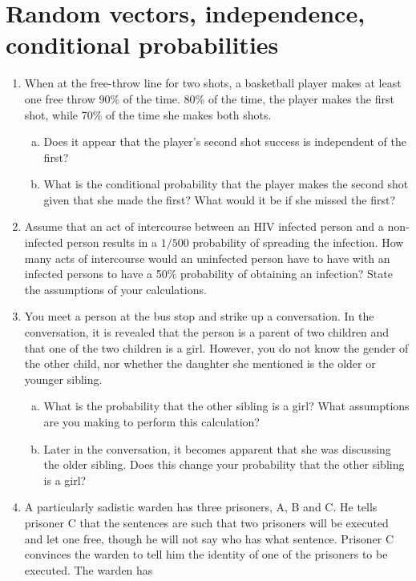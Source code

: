 \documentclass[12pt]{article}
\begin{document}
\section{Random vectors, independence, conditional probabilities}
\begin{enumerate}[1.]
\item When at the free-throw line for two shots, a basketball player
  makes at least one free throw 90\% of the time. 80\% of the time,
  the player makes the first shot, while 70\% of the time she makes
  both shots.
\begin{enumerate}[a.]
\item Does it appear that the player's second shot success is
  independent of the first?
\item What is the conditional probability that the player makes the
  second shot given that she made the first? What would it be if she
  missed the first?
\end{enumerate}
\item Assume that an act of intercourse between an HIV infected person
  and a non-infected person results in a $1/500$ probability of
  spreading the infection. How many acts of intercourse would an
  uninfected person have to have with an infected persons to have a
  50\% probability of obtaining an infection?  State the assumptions
  of your calculations.
\item You meet a person at the bus stop and strike up a
  conversation. In the conversation, it is revealed that the person is
  a parent of two children and that one of the two children is a
  girl. However, you do not know the gender of the other child, nor
  whether the daughter she mentioned is the older or younger sibling.
\begin{enumerate}[a.]
\item What is the probability that the other sibling is a girl? What
  assumptions are you making to perform this calculation?
\item Later in the conversation, it becomes apparent that she was
  discussing the older sibling.  Does this change your probability
  that the other sibling is a girl?
\end{enumerate}
\item A particularly sadistic warden has three prisoners, A, B and
  C. He tells prisoner C that the sentences are such that two
  prisoners will be executed and let one free, though he will not say
  who has what sentence. Prisoner C convinces the warden to tell him
  the identity of one of the prisoners to be executed. The warden has

\end{enumerate}
\end{document}
